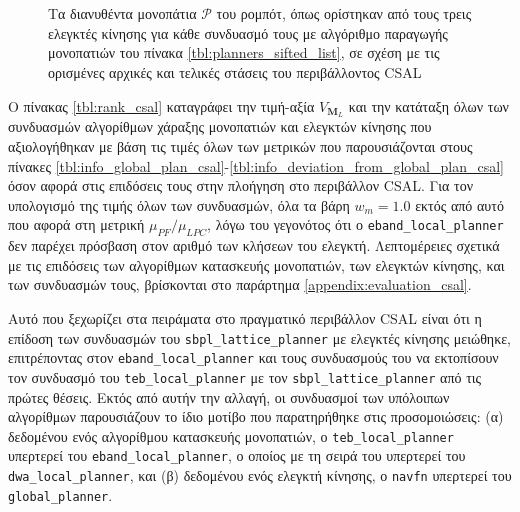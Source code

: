 \begin{figure*}\centering
  \begin{subfigure}[t]{\linewidth}
    \centering
    
  \end{subfigure}\\%
  \vspace{-1.5cm}
  \begin{subfigure}[t]{\linewidth}
    \centering
    
  \end{subfigure}\\%
  \vspace{-1.5cm}
  \begin{subfigure}[t]{\linewidth}
    \centering
    
  \end{subfigure}%
  \caption{\small Τα διανυθέντα μονοπάτια $\bm{\mathcal{P}}$ του ρομπότ, όπως
           ορίστηκαν από τους τρεις ελεγκτές κίνησης για κάθε συνδυασμό τους με
           αλγόριθμο παραγωγής μονοπατιών του πίνακα
           \ref{tbl:planners_sifted_list}, σε σχέση με τις ορισμένες αρχικές και
           τελικές στάσεις του περιβάλλοντος CSAL}
  \label{fig:poses:csal}
\end{figure*}

Ο πίνακας \ref{tbl:rank_csal} καταγράφει την τιμή-αξία $V_{\bm{M}_L}$
και την κατάταξη όλων των συνδυασμών αλγορίθμων χάραξης μονοπατιών και
ελεγκτών κίνησης που αξιολογήθηκαν με βάση τις τιμές όλων των μετρικών που
παρουσιάζονται στους πίνακες
\ref{tbl:info_global_plan_csal}-\ref{tbl:info_deviation_from_global_plan_csal}
όσον αφορά στις επιδόσεις τους στην πλοήγηση στο περιβάλλον CSAL. Για τον
υπολογισμό της τιμής όλων των συνδυασμών, όλα τα βάρη $w_m = 1.0$ εκτός από
αυτό που αφορά στη μετρική $\mu_{PF} / \mu_{LPC}$, λόγω του γεγονότος ότι ο
\texttt{eband\_local\_planner} δεν παρέχει πρόσβαση στον αριθμό των κλήσεων του
ελεγκτή. Λεπτομέρειες σχετικά με τις επιδόσεις των αλγορίθμων κατασκευής
μονοπατιών, των ελεγκτών κίνησης, και των συνδυασμών τους, βρίσκονται στο
παράρτημα \ref{appendix:evaluation_csal}.

Αυτό που ξεχωρίζει στα πειράματα στο πραγματικό περιβάλλον CSAL είναι ότι η
επίδοση των συνδυασμών του \texttt{sbpl\_lattice\_planner} με ελεγκτές κίνησης
μειώθηκε, επιτρέποντας στον \texttt{eband\_local\_planner} και τους συνδυασμούς
του να εκτοπίσουν τον συνδυασμό του \texttt{teb\_local\_planner} με τον
\texttt{sbpl\_lattice\_planner} από τις πρώτες θέσεις. Εκτός από αυτήν την
αλλαγή, οι συνδυασμοί των υπόλοιπων αλγορίθμων παρουσιάζουν το ίδιο μοτίβο που
παρατηρήθηκε στις προσομοιώσεις: (α) δεδομένου ενός αλγορίθμου κατασκευής
μονοπατιών, ο \texttt{teb\_local\_planner} υπερτερεί του
\texttt{eband\_local\_planner}, ο οποίος με τη σειρά του υπερτερεί του
\texttt{dwa\_local\_planner}, και (β) δεδομένου ενός ελεγκτή κίνησης, ο
\texttt{navfn} υπερτερεί του \texttt{global\_planner}.


